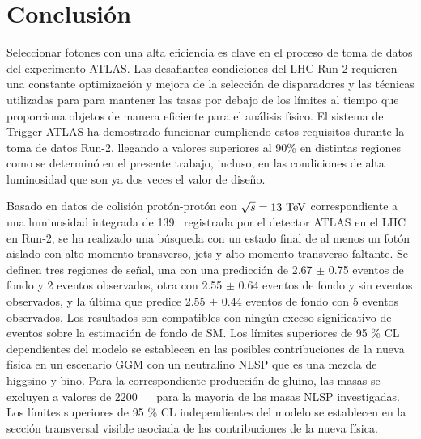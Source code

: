 \chapter{Conclusión}

Seleccionar fotones con una alta eficiencia es clave en el proceso de toma de datos del experimento ATLAS. Las desafiantes condiciones del LHC Run-2 requieren una constante optimización y mejora de la selección de disparadores y las técnicas utilizadas para para mantener las tasas por debajo de los límites al tiempo que proporciona objetos de manera eficiente para el análisis físico. El sistema de Trigger ATLAS ha demostrado funcionar cumpliendo estos requisitos durante la toma de datos Run-2, llegando a valores superiores al 90\% en distintas regiones como se determinó en el presente trabajo, incluso, en las condiciones de alta luminosidad que son ya dos veces el valor de diseño.

Basado en datos de colisión protón-protón con $\sqrt{s}=13\ \text{TeV}$ correspondiente a una luminosidad integrada de 139 \ifb\ registrada por el detector ATLAS
en el LHC en Run-2, se ha realizado una búsqueda con un estado final de al menos un fotón aislado con alto momento transverso, jets y alto momento transverso faltante. Se definen tres regiones de señal, una con una predicción de 2.67 $\pm$ 0.75 eventos de fondo y 2 eventos observados, otra con 2.55 $\pm$ 0.64 eventos de fondo y sin eventos observados, y la última que predice 2.55 $\pm$ 0.44 eventos de fondo con 5 eventos observados.
Los resultados son compatibles con ningún exceso significativo de eventos sobre la estimación de fondo de SM. Los límites superiores de 95 \% CL dependientes del modelo se establecen en las posibles contribuciones de la nueva física en un escenario GGM con un neutralino NLSP que es una mezcla de higgsino y bino. Para la correspondiente producción de gluino, las masas se excluyen a valores de 2200 ~ \gev\ para la mayoría de las masas NLSP investigadas. Los límites superiores de 95 \% CL independientes del modelo se establecen en la sección transversal visible asociada de las contribuciones de la nueva física.


